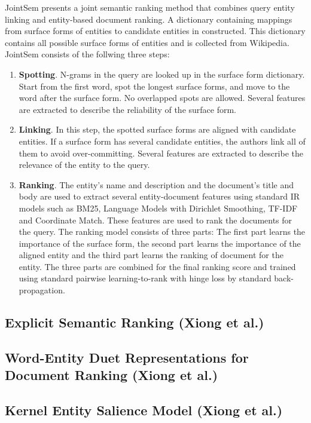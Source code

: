 \documentclass{article}
\begin{document}
JointSem presents a joint semantic ranking method that combines query entity linking and entity-based document ranking. A dictionary containing mappings from surface forms of entities to candidate entities in constructed. This dictionary contains all possible surface forms of entities and is collected from Wikipedia. JointSem consists of the follwing three steps:
\begin{enumerate}
    \item \textbf{Spotting}. N-grams in the query are looked up in the surface form dictionary. Start from the first word, spot the longest surface forms, and move to the word after the surface form. No overlapped spots are allowed. Several features are extracted to describe the reliability of the surface form.
    \item \textbf{Linking}. In this step, the spotted surface forms are aligned with candidate entities. If a surface form has several candidate entities, the authors link all of them to avoid over-committing. Several features are extracted to describe the relevance of the entity to the query.
    \item \textbf{Ranking}. The entity’s name and description and the document’s title and body are used to extract several entity-document features using standard IR models such as BM25, Language Models with Dirichlet Smoothing, TF-IDF and Coordinate Match. These features are used to rank the documents for the query. The ranking model consists of three parts: The first part learns the importance of the surface form, the second part learns the importance of the aligned entity and the third part learns the ranking of document for the entity. The three parts are combined for the final ranking score and trained using standard pairwise learning-to-rank with hinge loss by standard back-propagation.
\end{enumerate}

\subsection{Explicit Semantic Ranking (Xiong et al.\cite{xiong2017explicit})}
\label{subsec:esr}

\subsection{Word-Entity Duet Representations for Document Ranking (Xiong et al.\cite{xiong2017word})}
\label{subsec:word entity duet}

\subsection{Kernel Entity Salience Model (Xiong et al.\cite{xiong2018towards})}
\label{subsec:kesm}








\end{document}

